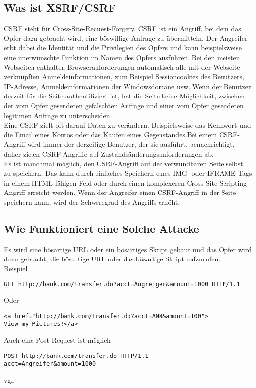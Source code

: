 {\subsection{Was ist XSRF/CSRF}
\label{sec:xsrf_what}
CSRF steht für Cross-Site-Request-Forgery. CSRF ist ein Angriff, bei dem das Opfer dazu gebracht wird, eine böswillige Anfrage zu übermitteln. Der Angreifer erbt dabei die Identität und die Privilegien des Opfers und kann beispielsweise eine unerwünschte Funktion im Namen des Opfers ausführen. Bei den meisten Webseiten enthalten Browseranforderungen automatisch alle mit der Webseite verknüpften Anmeldeinformationen, zum Beispiel Sessioncookies des Benutzers, IP-Adresse, Anmeldeinformationen der Windowsdomäne usw. Wenn der Benutzer derzeit für die Seite authentifiziert ist, hat die Seite keine Möglichkeit, zwischen der vom Opfer gesendeten gefälschten Anfrage und einer vom Opfer gesendeten legitimen Anfrage zu unterscheiden.
\\
Eine CSRF zielt oft darauf Daten zu verändern. Beispielsweise das Kennwort und die Email eines Kontos oder das Kaufen eines Gegenstandes.Bei einem CSRF-Angriff wird immer der derzeitige Benutzer, der sie ausführt, benachrichtigt, daher zielen CSRF-Angriffe auf Zustandsänderungsanforderungen ab.
\\
Es ist manchmal möglich, den CSRF-Angriff auf der verwundbaren Seite selbst zu speichern. Das kann durch einfaches Speichern eines IMG- oder IFRAME-Tags in einem HTML-fähigen Feld oder durch einen komplexeren Cross-Site-Scripting-Angriff erreicht werden. Wenn der Angreifer einen CSRF-Angriff in der Seite speichern kann, wird der Schweregrad des Angriffs erhöht. 
\subsection{Wie Funktioniert eine Solche Attacke}
\label{sec:xsrf_how}
Es wird eine bösartige URL oder ein bösartiges Skript gebaut und das Opfer wird dazu gebracht, die bösartige URL oder das bösartige Skript aufzurufen. 
\\
Beispiel
\begin{lstlisting}[caption={CSRF example}]
GET http://bank.com/transfer.do?acct=Angreiger&amount=1000 HTTP/1.1
\end{lstlisting}
Oder
\begin{lstlisting}[caption={CSRF example 2}]
<a href="http://bank.com/transfer.do?acct=ANN&amount=100">
View my Pictures!</a>
\end{lstlisting}
Auch eine Post Request ist möglich
\\
\begin{lstlisting}[caption={CSRF example 3}]
POST http://bank.com/transfer.do HTTP/1.1
acct=Angreifer&amount=1000
\end{lstlisting}
vgl. \textcite{CSRF}
}
